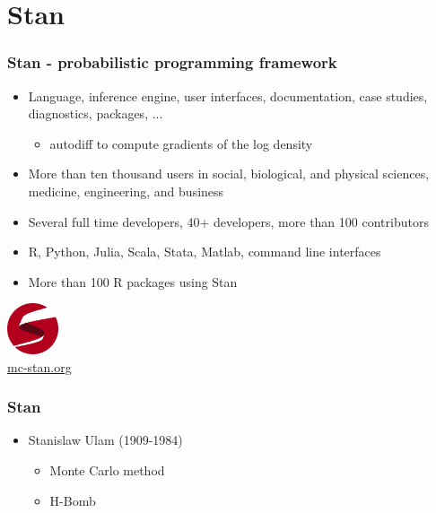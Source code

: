 \documentclass[10pt]{beamer}
\begin{document}
\section{Stan}
\frame{\sectionpage}

\begin{frame}

  \frametitle{Stan - probabilistic programming framework}

   \begin{itemize}
   \item Language, inference engine, user interfaces, documentation,
     case studies, diagnostics, packages, ...
     \begin{itemize}
     \item autodiff to compute gradients of the log density
     \end{itemize}
   \item<2-> More than ten thousand users in social, biological, and
     physical sciences, medicine, engineering, and business

   \item<3-> Several full time developers, 40+ developers, more than 100 contributors
   \item<4-> R, Python, Julia, Scala, Stata, Matlab, command line interfaces
    \item<4-> More than 100 R packages using Stan
   \end{itemize}
  \vfill
  \begin{center}
    \includegraphics[width=1.5cm]{figs/stan_logo_wide.png}\\
    \url{mc-stan.org}
  \end{center}
\end{frame}

\begin{frame}

\frametitle{Stan}

  \begin{itemize}
  \item Stanislaw Ulam (1909-1984)
    \begin{itemize}
    \item Monte Carlo method
    \item H-Bomb
    \end{itemize}
  \end{itemize}

\end{frame}
\end{document}
